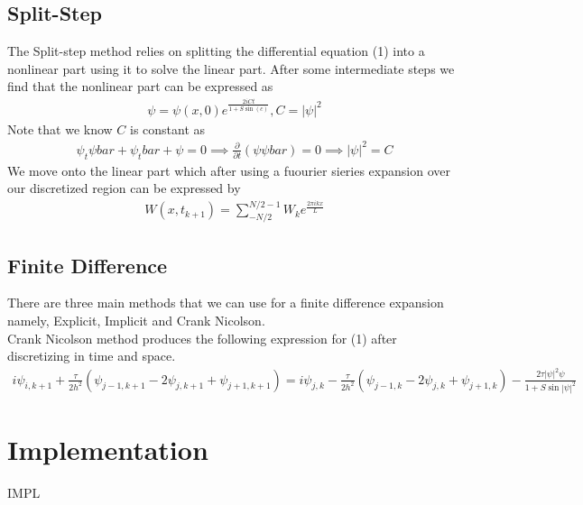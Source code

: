 \documentclass{article}
\begin{document}
\subsection{Split-Step}
The Split-step method relies on splitting the differential equation (1) into a nonlinear part using it to solve the linear part. After some intermediate steps we find that the nonlinear part can be expressed as
\begin{align}
\psi = \psi(x,0) e^{\frac{2iCt}{1+S\sin(c)}}, C = |\psi|^2
\end{align}
Note that we know $C$ is constant as 
\begin{align}
\psi_t \psi bar + \psi_t bar + \psi = 0 \implies \frac{\partial}{\partial t}(\psi\psi bar) = 0 \implies |\psi|^2 = C
\end{align}
We move onto the linear part which after using a fuourier sieries expansion over our discretized region can be expressed by
\begin{align}
W(x,t_{k+1}) = \sum_{-N/2}^{N/2-1} W_k e^{\frac{2 \pi i k x}{L}}
\end{align}
\subsection{Finite Difference}
There are three main methods that we can use for a finite difference expansion namely, Explicit, Implicit and Crank Nicolson. \\
Crank Nicolson method produces the following expression for (1) after discretizing in time and space. 
\begin{align}
i\psi_{i,k+1} + \frac{\tau}{2h^2}(\psi_{j-1,k+1} -2\psi_{j,k+1} + \psi_{j+1,k+1}) = i\psi_{j,k} - \frac{\tau}{2h^2}(\psi_{j-1,k}-2\psi_{j,k} + \psi_{j+1,k}) - \frac{2\tau |\psi|^2 \psi}{1+S\sin|\psi|^2}
\end{align}
\section{Implementation}
IMPL
\end{document}
